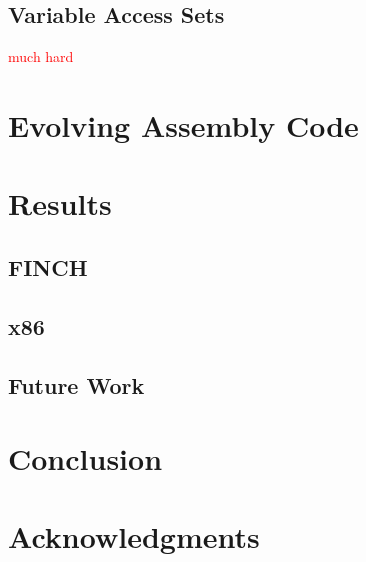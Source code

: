 \documentclass{sig-alternate}
\newcommand{\mycomment}[1]{\textcolor{red}{#1}}
\begin{document}
\subsection{Variable Access Sets}
\cite{FINCH2:2009} \mycomment{much hard}


\section{Evolving Assembly Code}

\section{Results}
\subsection{FINCH}
\subsection{x86}

\subsection{Future Work}

\section{Conclusion}


\section{Acknowledgments}


%

%
%
\end{document}
